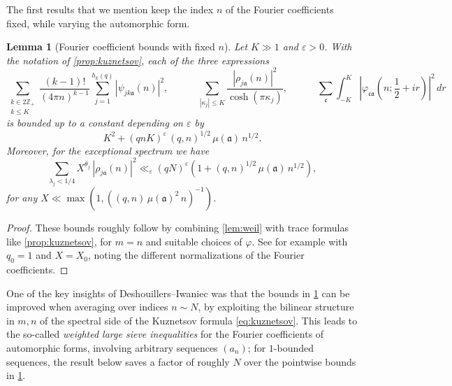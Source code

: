 \documentclass[reqno,11pt]{amsart}
\newtheorem{knownlemma}[knowntheorem]{Lemma}
\theoremstyle{remark}
\numberwithin{equation}{section}
\newcommand{\Z}{\mathbb{Z}}
\newcommand{\ma}{\mathfrak{a}}
\newcommand{\mc}{\mathfrak{c}}
\newcommand{\eps}{\varepsilon}
\newcommand{\ch}{\cosh}
\begin{document}
The first results that we mention keep the index $n$ of the Fourier coefficients fixed, while varying the automorphic form.

\begin{knownlemma}[Fourier coefficient bounds with fixed $n$] \label{lem:coefficient-bounds}
    Let $K \gg 1$ and $\eps > 0$. With the notation of \cref{prop:kuznetsov}, each of the three expressions 
    \[
        \sum_{\substack{k \in 2\Z_+ \\ k \le K}} \frac{(k-1)!}{(4\pi n)^{k-1}} \sum_{j = 1}^{h_k(q)}  |\psi_{jk\ma}(n)|^2,
        \qquad\quad
        \sum_{|\kappa_j| \le K} \frac{|\rho_{j\ma}(n)|^2}{\ch(\pi \kappa_j)},
        \qquad\quad
        \sum_{\mc} \int_{-K}^K \left\vert \varphi_{\mc\ma}\left(n; \frac{1}{2} + ir\right) \right\vert^2\, dr
    \]
    is bounded up to a constant depending on $\eps$ by
    \[
        K^2 + (qnK)^{\eps}\, (q, n)^{1/2}\, \mu(\ma)\, n^{1/2}.
    \]
    Moreover, for the exceptional spectrum we have 
    \begin{equation} \label{eq:coefficient-bound-exceptional}
        \sum_{\lambda_j < 1/4} X^{\theta_j}\, |\rho_{j\ma}(n)|^2 \ll_\eps 
        (qN)^\eps \left(1 + (q, n)^{1/2}\, \mu(\ma)\, n^{1/2}\right),
    \end{equation}
    for any $X \ll \max\left(1, \left((q, n)\, \mu(\ma)^2\, n\right)^{-1}\right)$.
\end{knownlemma}

\begin{proof}
These bounds roughly follow by combining \cref{lem:weil} with trace formulas like \cref{prop:kuznetsov}, for $m = n$ and suitable choices of $\varphi$.
See for example \cite[Lemmas 2.7 and 2.9]{topacogullari2017certain} with $q_0 = 1$ and $X = X_0$, noting the different normalizations of the Fourier coefficients.
\end{proof}


One of the key insights of Deshouillers--Iwaniec \cite{deshouillers1982kloosterman} was that the bounds in \cref{lem:coefficient-bounds} can be improved when averaging over indices $n \sim N$, by exploiting the bilinear structure in $m, n$ of the spectral side of the Kuznetsov formula \cref{eq:kuznetsov}. This leads to the so-called \emph{weighted large sieve inequalities} for the Fourier coefficients of automorphic forms, involving arbitrary sequences $(a_n)$; for $1$-bounded sequences, the result below saves a factor of roughly $N$ over the pointwise bounds in \cref{lem:coefficient-bounds}.
\end{document}

